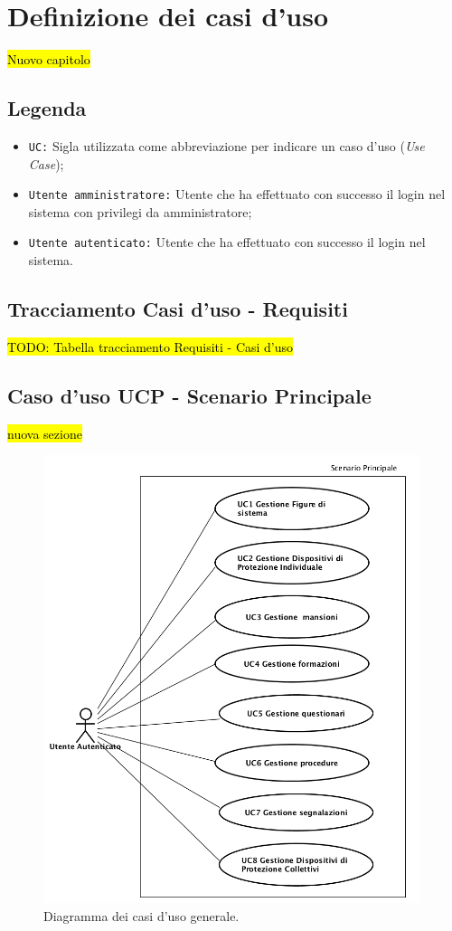 \cleardoublepage

\section{Definizione dei casi d'uso}
\hl{Nuovo capitolo}
	\subsection{Legenda}
	\begin{itemize}
		\item \texttt{UC:} Sigla utilizzata come abbreviazione per indicare un caso d'uso (\textit{Use Case});
		\item \texttt{Utente amministratore:} Utente che ha effettuato con successo il login nel sistema con privilegi da amministratore;
		\item \texttt{Utente autenticato:} Utente che ha effettuato con successo il login nel sistema.
	\end{itemize}
	
	\subsection{Tracciamento Casi d'uso - Requisiti}
		\hl{TODO: Tabella tracciamento Requisiti  - Casi d'uso}
	\subsection{Caso d'uso UCP - Scenario Principale }
	\hl{nuova sezione} \\
	\begin{figure}[H]
		\begin{center}
			\includegraphics[width=11cm]{Pics/Diagramma_generale_dei_casi_d_uso.png}
			\caption{
				Diagramma dei casi d'uso generale.}
			\label{fig:DiagrammaGeneraleCasiDuso}
		\end{center}
	\end{figure}	
	
